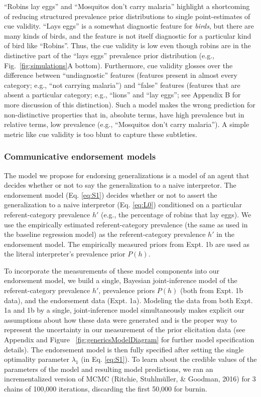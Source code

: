 \documentclass[english,floatsintext,man]{apa6}
\theoremstyle{definition}
\theoremstyle{definition}
\theoremstyle{definition}
\theoremstyle{remark}
\begin{document}
\enquote{Robins lay eggs} and \enquote{Mosquitos don't carry malaria}
highlight a shortcoming of reducing structured prevalence prior
distributions to single point-estimates of cue validity. \enquote{Lays
eggs} is a somewhat diagnostic feature for \emph{birds}, but there are
many kinds of birds, and the feature is not itself diagnostic for a
particular kind of bird like \enquote{Robins}. Thus, the cue validity is
low even though robins are in the distinctive part of the \enquote{lays
eggs} prevalence prior distribution (e.g., Fig.~\ref{fig:simulations}A
bottom). Furthermore, cue validity glosses over the difference between
\enquote{undiagnostic} features (features present in almost every
category; e.g., \enquote{not carrying malaria}) and \enquote{false}
features (features that are absent a particular category; e.g.,
\enquote{lions} and \enquote{lay eggs}; see Appendix B for more
discussion of this distinction). Such a model makes the wrong prediction
for non-distinctive properties that in, absolute terms, have high
prevalence but in relative terms, low prevalence (e.g.,
\enquote{Mosquitos don't carry malaria}). A simple metric like cue
validity is too blunt to capture these subtleties.

\subsubsection{Communicative endorsement
models}\label{communicative-endorsement-models}

The model we propose for endorsing generalizations is a model of an
agent that decides whether or not to say the generalization to a naive
interpretor. The endorsement model (Eq. \ref{eq:S1}) decides whether or
not to assert the generalization to a naive interpretor (Eq.
\ref{eq:L0}) conditioned on a particular referent-category prevalence
\(h'\) (e.g., the percentage of robins that lay eggs). We use the
empirically estimated referent-category prevalence (the same as used in
the baseline regression model) as the referent-category prevalence
\(h'\) in the endorsement model. The empirically measured priors from
Expt. 1b are used as the literal interpreter's prevalence prior
\(P(h)\).

To incorporate the measurements of these model components into our
endorsement model, we build a single, Bayesian joint-inference model of
the referent-category prevalence \(h'\), prevalence priors \(P(h)\)
(both from Expt. 1b data), and the endorsement data (Expt. 1a). Modeling
the data from both Expt. 1a and 1b by a single, joint-inference model
simultaneously makes explicit our assumptions about how these data were
generated and is the proper way to represent the uncertainty in our
measurement of the prior elicitation data (see Appendix and Figure~
\ref{fig:genericsModelDiagram} for further model specification details).
The endorsement model is then fully specified after setting the single
optimality parameter \(\lambda_1\) (in Eq. \ref{eq:S1}). To learn about
the credible values of the parameters of the model and resulting model
predictions, we ran an incrementalized version of MCMC (Ritchie,
Stuhlmüller, \& Goodman, 2016) for 3 chains of 100,000 iterations,
discarding the first 50,000 for burnin.
\end{document}

